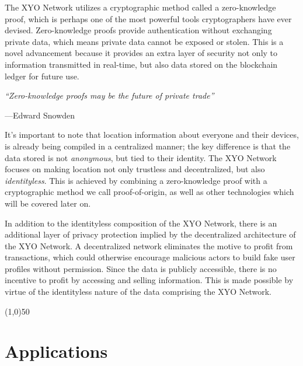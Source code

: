 \documentclass{article}
\begin{document}
The XYO Network utilizes a cryptographic method called a zero-knowledge proof, which is perhaps one of the most powerful tools cryptographers have ever devised. Zero-knowledge proofs provide authentication without exchanging private data, which means private data cannot be exposed or stolen. This is a novel advancement because it provides an extra layer of security not only to information transmitted in real-time, but also data stored on the blockchain ledger for future use.

\begin{displayquote}\textit{``Zero-knowledge proofs may be the future of private trade''} \cite{snowden-privatetrade}

\vspace{2mm}
---Edward Snowden
\end{displayquote}

It's important to note that location information about everyone and their devices, is already being compiled in a centralized manner; the key difference is that the data stored is not \textit{anonymous}, but tied to their identity. The XYO Network focuses on making location not only \gls{trustless} and decentralized, but also \textit{identityless}. This is achieved by combining a zero-knowledge proof with a cryptographic method we call \Gls{proof-of-origin}, as well as other technologies which will be covered later on.

In addition to the identityless composition of the XYO Network, there is an additional layer of privacy protection implied by the decentralized architecture of the XYO Network. A decentralized network eliminates the motive to profit from transactions, which could otherwise encourage malicious actors to build fake user profiles without permission. Since the data is publicly accessible, there is no incentive to profit by accessing and selling information. This is made possible by virtue of the identityless nature of the data comprising the XYO Network.

\begin{center}
\line(1,0){50}
\end{center}

\section{Applications}
\end{document}
